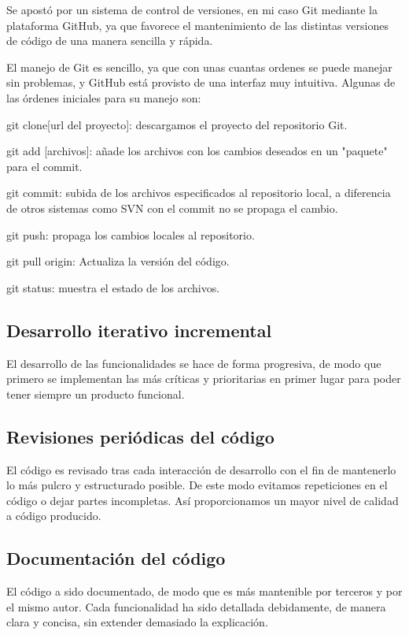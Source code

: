 Se apostó por un sistema de control de versiones, en mi caso Git mediante la plataforma GitHub, ya que favorece el mantenimiento de las distintas versiones de código de una manera sencilla y rápida.

El manejo de Git es sencillo, ya que con unas cuantas ordenes se puede manejar sin problemas, y GitHub está provisto de una interfaz muy intuitiva. Algunas de las órdenes iniciales para su manejo son:

git clone[url del proyecto]: descargamos el proyecto del repositorio Git.

git add [archivos]: añade los archivos con los cambios deseados en un "paquete" para el commit.

git commit: subida de los archivos especificados al repositorio local, a diferencia de otros sistemas como SVN con el commit no se propaga el cambio.

git push:  propaga los cambios locales al repositorio.

git pull origin: Actualiza la versión del código.

git status: muestra el estado de los archivos.

\bigskip
\subsection{Desarrollo iterativo incremental}
\bigskip

El desarrollo de las funcionalidades se hace de forma progresiva, de modo que primero se implementan las más críticas y prioritarias en primer lugar para poder tener siempre un producto funcional.

\bigskip
\subsection{Revisiones periódicas del código}
\bigskip

El código es revisado tras cada interacción de desarrollo con el fin de mantenerlo lo más pulcro y estructurado posible. De este modo evitamos repeticiones en el código o dejar partes incompletas. Así proporcionamos un mayor nivel de calidad a código producido.

\bigskip
\subsection{Documentación del código}
\bigskip

El código a sido documentado, de modo que es más mantenible por terceros y por el mismo autor. Cada funcionalidad ha sido detallada debidamente, de manera clara y concisa, sin extender demasiado la explicación.


